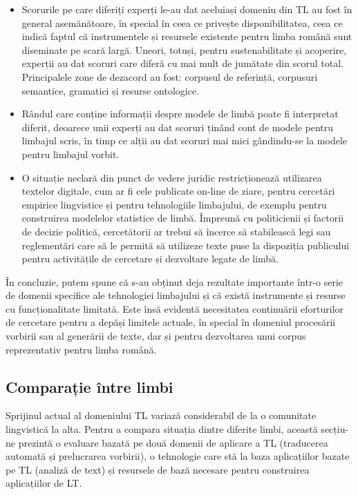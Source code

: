 \begin{multicols}{2}
\begin{itemize}
\item Scorurile pe care diferiți experți le-au dat aceluiași domeniu din TL au fost în general asemănătoare, în special în ceea ce privește disponibilitatea, ceea ce indică faptul că instrumentele și resursele existente pentru limba română sunt diseminate pe scară largă. Uneori, totuși, pentru sustenabilitate și acoperire, experții au dat scoruri care diferă cu mai mult de jumătate din scorul total. Principalele zone de dezacord au fost: corpusul de referință, corpusuri semantice, gramatici și resurse ontologice.
\item Rândul care conține informații despre modele de limbă poate fi interpretat diferit, deoarece unii experți au dat scoruri ținând cont de modele pentru limbajul scris, în timp ce alții au dat scoruri mai mici gândindu-se la modele pentru limbajul vorbit. 
\item O situație neclară din punct de vedere juridic restricționează utilizarea textelor digitale, cum ar fi cele publicate on-line de ziare, pentru cercetări empirice lingvistice și pentru tehnologiile limbajului, de exemplu pentru construirea modelelor statistice de limbă. Împreună cu politicienii și factorii de decizie politică, cercetătorii ar trebui să încerce să stabilească legi sau reglementări care să le permită să utilizeze texte puse la dispoziția publicului pentru activitățile de cercetare și dezvoltare legate de limbă.
\end{itemize}

În concluzie, putem spune că s-au obținut deja rezultate importante într-o serie de domenii specifice ale tehnologiei limbajului și că există instrumente și resurse cu funcționalitate limitată. Este însă evidentă necesitatea continuării eforturilor de cercetare pentru a depăși limitele actuale, în special în domeniul procesării vorbirii sau al generării de texte, dar și pentru dezvoltarea unui corpus reprezentativ pentru limba română.

\subsection{Comparație între limbi}

Sprijinul actual al domeniului TL variază considerabil de la o comunitate lingvistică la alta. Pentru a compara situația dintre diferite limbi, această secțiu-\newline ne prezintă o evaluare bazată pe două domenii de aplicare a TL (traducerea automată și prelucrarea vorbirii), o tehnologie care stă la baza aplicațiilor bazate pe TL (analiză de text) și resursele de bază necesare pentru construirea aplicațiilor de LT.


\end{multicols}
